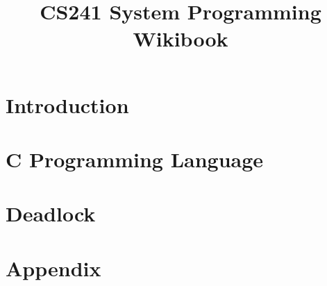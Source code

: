 \documentclass[hidelinks,11pt]{book}
\title{\vspace{-15mm}\fontsize{24pt}{10pt}\selectfont\textbf{CS241 System Programming Wikibook}}
\date{}
\newcommand{\inputchapter}[2]{\chapter{#2}}
\begin{document}
\raggedbottom

\pagestyle{fancy}
\fancyhf{}
\setcounter{secnumdepth}{1}
\setcounter{tocdepth}{1}

\maketitle

\tableofcontents

\inputchapter{introduction/introduction}{Introduction}
\inputchapter{introc/introc}{C Programming Language}
\inputchapter{deadlock/deadlock}{Deadlock}
\inputchapter{appendix/appendix}{Appendix}

\printglossaries
\end{document}
